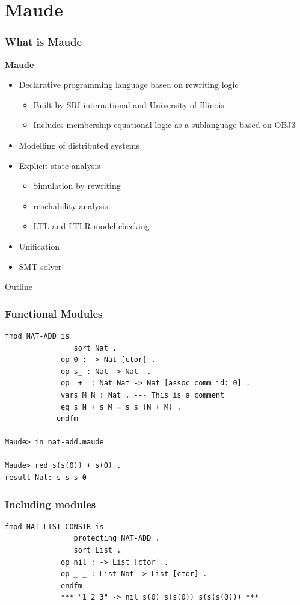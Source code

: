 \documentclass{beamer}
\begin{document}
\section{Maude}
\begin{frame}
    \frametitle{What is Maude}
    \textbf{Maude}
    \begin{itemize}
        \pause
        \item Declarative programming language based on rewriting logic 
        \begin{itemize}
            \item Built by SRI international and University of Illinois
            \item Includes membership equational logic as a sublanguage based on OBJ3 
        \end{itemize}
        \pause
        \item Modelling of distributed systems 
        \pause 
        \item  Explicit state analysis 
        \begin{itemize}
            \item Simulation by rewriting 
            \item reachability analysis 
            \item LTL and LTLR model checking 
        \end{itemize}
        \pause 
        
        \item Unification 
        \item SMT solver
    \end{itemize}
\end{frame}
\begin{frame}{Outline}
\end{frame}
\begin{frame}[fragile]
    \frametitle{Functional Modules}
    \begin{lstlisting}[language=maude]
            fmod NAT-ADD is
                sort Nat .
             op 0 : -> Nat [ctor] .
             op s_ : Nat -> Nat  .
             op _+_ : Nat Nat -> Nat [assoc comm id: 0] .
             vars M N : Nat . --- This is a comment
             eq s N + s M = s s (N + M) .
            endfm

Maude> in nat-add.maude 

Maude> red s(s(0)) + s(0) .
result Nat: s s s 0

    \end{lstlisting}
\end{frame}
    \begin{frame}[fragile]
        \frametitle{Including modules}
        \begin{lstlisting}[language=maude]
            fmod NAT-LIST-CONSTR is
                protecting NAT-ADD .
                sort List .
             op nil : -> List [ctor] .
             op _ _ : List Nat -> List [ctor] .
             endfm
             *** "1 2 3" -> nil s(0) s(s(0)) s(s(s(0))) ***
        \end{lstlisting}
        
    \end{frame}
\end{document}
